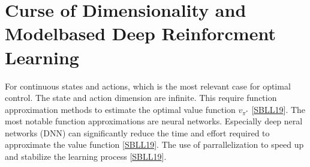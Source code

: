 \documentclass[letterpaper,10pt,english]{jupyterBook}
\begin{document}
\section{Curse of Dimensionality and Model\sphinxhyphen{}based Deep Reinforcment Learning}
\label{\detokenize{Reinforcement_learning:curse-of-dimensionality-and-model-based-deep-reinforcment-learning}}
\sphinxAtStartPar
For continuous states and actions, which is the most relevant case for optimal control. The state and action dimension are infinite. This require function approximation methods to estimate the optimal value function \(v_{\pi^*}\) {[}\hyperlink{cite.Discussion:id53}{SBLL19}{]}. The most notable function approximations are neural networks. Especially deep neral networks (DNN) can significantly reduce the time and effort required to approximate the value function {[}\hyperlink{cite.Discussion:id53}{SBLL19}{]}. The use of parrallelization to speed up and stabilize the learning process {[}\hyperlink{cite.Discussion:id53}{SBLL19}{]}.
\end{document}
